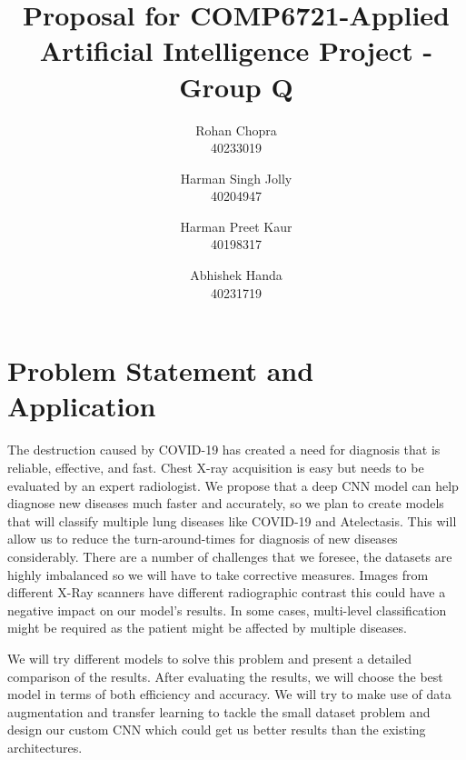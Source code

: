 \documentclass[10pt,twocolumn,letterpaper]{article}
\def\subjectNum{COMP6721}
\def\subName{Applied Artificial Intelligence }
\begin{document}


\title{Proposal for \subjectNum-\subName Project - Group Q}

\author{Rohan Chopra\\
\small 40233019\\
\and
Harman Singh Jolly\\
\small 40204947\\
\and
Harman Preet Kaur\\
\small 40198317\\
\and
Abhishek Handa\\
\small 40231719\\
}
\maketitle
\section{Problem Statement and Application}
\label{sec:intro}
The destruction caused by COVID-19 has created a need for diagnosis 
that is reliable, effective, and fast. Chest 
X-ray acquisition is easy but needs to be evaluated by an expert 
radiologist. We propose that a deep CNN model can help 
diagnose new diseases much 
faster and accurately, so we plan to create models that will 
classify multiple lung diseases like COVID-19 and 
Atelectasis. This will allow us to reduce the turn-around-times 
for diagnosis of new diseases considerably. 
There are a number of challenges that we foresee, the datasets 
are highly imbalanced so we will have to take corrective measures. Images 
from different X-Ray scanners have different radiographic contrast 
\cite{andrew2022rad} this could have a negative impact on our model's results. 
In some cases, multi-level classification might be required as the patient might 
be affected by multiple diseases.
 
We will try different models to solve this problem and present a 
detailed comparison of the results. After evaluating the results, 
we will choose the best model in terms of both efficiency and 
accuracy. We will try to make use of data augmentation and 
transfer learning to tackle the small dataset problem and design 
our custom CNN which could get us better results 
than the existing architectures. 
\end{document}
